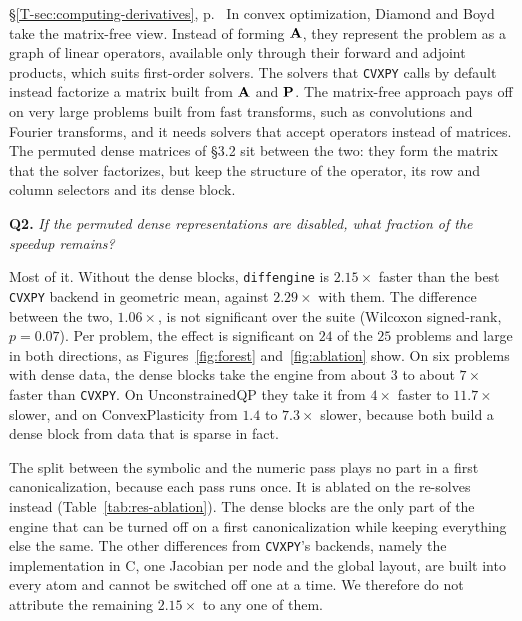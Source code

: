 \documentclass[letterpaper,12pt]{article}
\newcommand{\tsec}[1]{\S\ref{T-#1}}
\newcommand{\tpage}[1]{p.~\pageref{T-#1}}
\newcommand{\tref}[1]{\tsec{#1}, \tpage{#1}}
\newcommand{\question}[2]{\FloatBarrier\par\bigskip\textbf{Q#1.} \emph{#2}\par}
\begin{document}
\begin{thesisquote}{\tref{sec:computing-derivatives}}
In convex optimization, Diamond and Boyd take the matrix-free view. Instead of forming
$\mathbf{A}$, they represent the problem as a graph of linear operators, available only through
their forward and adjoint products, which suits first-order solvers. The solvers that
\texttt{CVXPY} calls by default instead factorize a matrix built from $\mathbf{A}$ and $\mathbf{P}$.
The matrix-free approach pays off on very large problems built from fast transforms, such as
convolutions and Fourier transforms, and it needs solvers that accept operators instead of
matrices. The permuted dense matrices of \S3.2 sit between the two: they form the matrix that
the solver factorizes, but keep the structure of the operator, its row and column selectors and
its dense block.
\end{thesisquote}

\question{2}{If the permuted dense representations are disabled, what fraction of the speedup
remains?}
Most of it. Without the dense blocks, \texttt{diffengine} is $2.15\times$ faster than the best
\texttt{CVXPY} backend in geometric mean, against $2.29\times$ with them. The difference between
the two, $1.06\times$, is not significant over the suite (Wilcoxon signed-rank, $p = 0.07$).
Per problem, the effect is significant on $24$ of the $25$ problems and large in both
directions, as Figures~\ref{fig:forest} and~\ref{fig:ablation} show. On six
problems with dense data, the dense blocks take the engine from about $3$ to about $7\times$
faster than \texttt{CVXPY}. On UnconstrainedQP they take it from $4\times$ faster to $11.7\times$
slower, and on ConvexPlasticity from $1.4$ to $7.3\times$ slower, because both build a dense
block from data that is sparse in fact.

The split between the symbolic and the numeric pass plays no part in a first
canonicalization, because each pass runs once. It is ablated on the re-solves instead
(Table~\ref{tab:res-ablation}). The dense blocks are the only part of the engine that can be
turned off on a first canonicalization while keeping everything else the same. The other
differences from \texttt{CVXPY}'s backends, namely the implementation in C, one Jacobian per
node and the global layout, are built into every atom and cannot be switched off one at a time.
We therefore do not attribute the remaining $2.15\times$ to any one of them.
\end{document}
